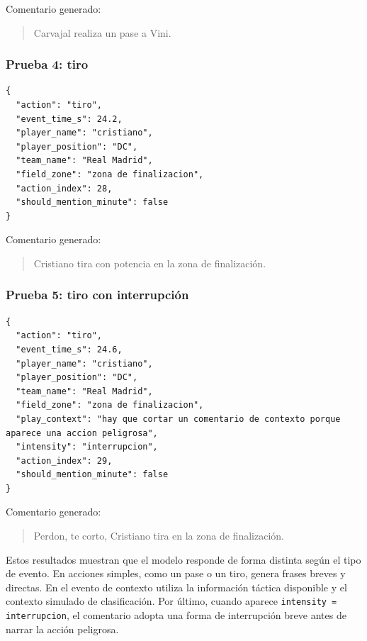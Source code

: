 Comentario generado:

\begin{quote}
Carvajal realiza un pase a Vini.
\end{quote}

\subsubsection*{Prueba 4: tiro}

\begin{verbatim}
{
  "action": "tiro",
  "event_time_s": 24.2,
  "player_name": "cristiano",
  "player_position": "DC",
  "team_name": "Real Madrid",
  "field_zone": "zona de finalizacion",
  "action_index": 28,
  "should_mention_minute": false
}
\end{verbatim}

Comentario generado:

\begin{quote}
Cristiano tira con potencia en la zona de finalización.
\end{quote}

\subsubsection*{Prueba 5: tiro con interrupción}

\begin{verbatim}
{
  "action": "tiro",
  "event_time_s": 24.6,
  "player_name": "cristiano",
  "player_position": "DC",
  "team_name": "Real Madrid",
  "field_zone": "zona de finalizacion",
  "play_context": "hay que cortar un comentario de contexto porque aparece una accion peligrosa",
  "intensity": "interrupcion",
  "action_index": 29,
  "should_mention_minute": false
}
\end{verbatim}

Comentario generado:

\begin{quote}
Perdon, te corto, Cristiano tira en la zona de finalización.
\end{quote}

Estos resultados muestran que el modelo responde de forma distinta según el tipo de evento. En acciones simples, como un pase o un tiro, genera frases breves y directas. En el evento de contexto utiliza la información táctica disponible y el contexto simulado de clasificación. Por último, cuando aparece \texttt{intensity = interrupcion}, el comentario adopta una forma de interrupción breve antes de narrar la acción peligrosa.

